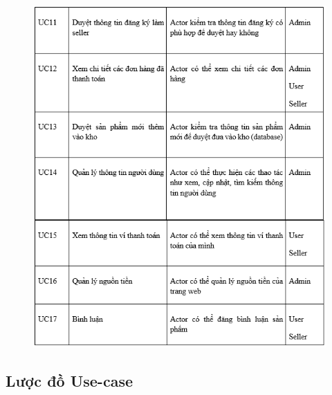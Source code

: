 \documentclass{article}
\begin{document}
\begin{center}
	\begin{figure}[htp]
		\begin{center}
			
			\includegraphics[scale=.930]{anh7.png}
			
		\end{center}
		
		
	\end{figure}
\end{center}
\newpage


\subsection{Lược đồ Use-case}
\end{document}
